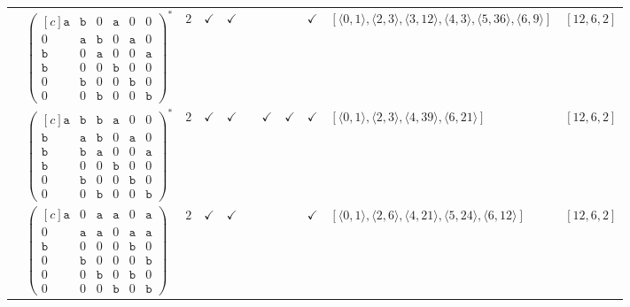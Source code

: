\documentclass[12pt]{article}
\theoremstyle{definition}
\theoremstyle{plain}
\begin{document}
{\begin{longtable}{@{}cYcccccccZc@{}}
\cmidrule(lr){2-11}


& $\begin{pmatrix*}[c]
\mathtt{a}  &  \mathtt{b}  &  0  &  \mathtt{a}  &  0  &  0  \\
0 &  \mathtt{a}  &  \mathtt{b}  &  0  &  \mathtt{a}  &  0  \\
\mathtt{b}  &  0  &  \mathtt{a}  &  0  &  0  &  \mathtt{a}  \\
\mathtt{b}  &  0  &  0  &  \mathtt{b}  &  0  &  0  \\
0  &  \mathtt{b}  &  0  &  0  &  \mathtt{b}  &  0  \\
0  &  0  &  \mathtt{b}  &  0  &  0  &  \mathtt{b}
\end{pmatrix*}^*$
& $2$
& $\checkmark$
& $\checkmark$
&
&
&
& $\checkmark$
& $[\langle0,1\rangle,\allowbreak\langle2,3\rangle,\allowbreak\langle3,12\rangle,\allowbreak\langle4,3\rangle,\allowbreak\langle5,36\rangle,\allowbreak\langle6,9\rangle]$
& $[12,6,2]$     \\

\cmidrule(lr){2-11}

& $\begin{pmatrix*}[c]
\mathtt{a}  &  \mathtt{b}  &  \mathtt{b}  &  \mathtt{a}  &  0  &  0  \\
\mathtt{b} &  \mathtt{a}  &  \mathtt{b}  &  0  &  \mathtt{a}  &  0  \\
\mathtt{b}  &  \mathtt{b}  &  \mathtt{a}  &  0  &  0  &  \mathtt{a}  \\
\mathtt{b}  &  0  &  0  &  \mathtt{b}  &  0  &  0  \\
0  &  \mathtt{b}  &  0  &  0  &  \mathtt{b}  &  0  \\
0  &  0  &  \mathtt{b}  &  0  &  0  &  \mathtt{b}
\end{pmatrix*}^*$
& $2$
& $\checkmark$
& $\checkmark$
&
& $\checkmark$
& $\checkmark$
& $\checkmark$
& $[\langle0,1\rangle,\allowbreak\langle2,3\rangle,\allowbreak\langle4,39\rangle,\allowbreak\langle6,21\rangle]$
& $[12,6,2]$\\

\cmidrule(lr){2-11}



& $\begin{pmatrix*}[c]
\mathtt{a}  &  0  &  \mathtt{a}  &  \mathtt{a}  &  0  &  \mathtt{a}  \\
0  &  \mathtt{a}  &  \mathtt{a}  &  0  &  \mathtt{a}  &  \mathtt{a}  \\
\mathtt{b}  &  0  &  0  &  0  &  \mathtt{b}  &  0  \\
0  &  \mathtt{b}  &  0  &  0  &  0  &  \mathtt{b}  \\
0  &  0  &  \mathtt{b}  &  0  &  \mathtt{b}  & 0   \\
0  &  0  &  0  &  \mathtt{b}  &  0   &  \mathtt{b}
\end{pmatrix*}$
& $2$
& $\checkmark$
& $\checkmark$
&
&
&
& $\checkmark$
& $[\langle0,1\rangle,\allowbreak\langle2,6\rangle,\allowbreak\langle4,21\rangle,\allowbreak\langle5,24\rangle,\allowbreak\langle6,12\rangle]$
& $[12,6,2]$     \\


\end{longtable}}
\end{document}
